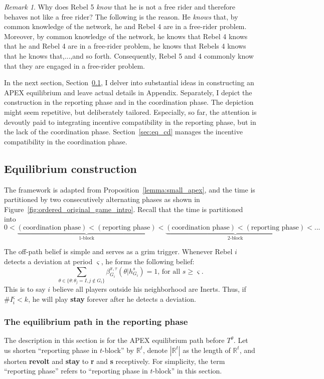 \documentclass[12pt,letter]{article}
\newcommand{\Omicron}{\mathbb{R}}
\theoremstyle{definition}
\theoremstyle{remark}
\newtheorem*{remark}{Remark}
\theoremstyle{claim}
\begin{document}
\begin{remark}
Why does Rebel 5 \textit{know} that he is not a free rider and therefore behaves not like a free rider? The following is the reason. He \textit{knows} that, by common knowledge of the network, he and Rebel 4 are in a free-rider problem. Moreover, by common knowledge of the network, he knows that Rebel 4 knows that he and Rebel 4 are in a free-rider problem, he knows that Rebels 4 knows that he knows that,...,and so forth. Consequently, Rebel 5 and 4 commonly know that they are engaged in a free-rider problem. 
\end{remark}
In the next section, Section~\ref{sec:dis_writing}, I delver into substantial ideas in constructing an APEX equilibrium and leave actual details in Appendix. Separately, I depict the construction in the reporting phase and in the coordination phase. The depiction might seem repetitive, but deliberately tailored. Especially, so far, the attention is devoutly paid to integrating incentive compatibility in the reporting phase, but in the lack of the coordination phase. Section~\ref{sec:eq_cd} manages the incentive compatibility in the coordination phase.
\subsection{Equilibrium construction}
\label{sec:dis_writing}
The framework is adapted from Proposition~\ref{lemma:small_apex}, and the time is partitioned by two consecutively alternating phases as shown in Figure~\ref{fig:ordered_original_game_intro}. Recall that the time is partitioned into
\[0<\underbrace{(\text{coordination phase})<(\text{reporting phase})}_{\text{$1$-block}}<\underbrace{(\text{coordination phase})<(\text{reporting phase})}_{\text{$2$-block}}<...\]

The off-path belief is simple and serves as a grim trigger. Whenever Rebel $i$ detects a deviation at period $\varsigma$, he forms the following belief: 
\begin{equation}
\label{eq_grim_trigger}
\sum_{\theta \in \{\theta:\theta_j=I,j\notin G_i\}}\beta^{\pi,\tau}_{G_i}({\theta}|h^{s}_{G_i})=1 \text{, for all $s\geq \varsigma$}.
\end{equation}
This is to say $i$ believe all players outside his neighborhood are Inerts. Thus, if $\# I^{\varsigma}_i<k$, he will play \textbf{stay} forever after he detects a deviation. 

\subsubsection{The equilibrium path in the reporting phase}
\label{sec:eq_rp}
The description in this section is for the APEX equilibrium path {before} $T^{\theta}$. Let us shorten ``reporting phase in $t$-block'' by $\Omicron^{t}$, denote $|\Omicron^t|$ as the length of $\Omicron^{t}$, and shorten \textbf{revolt} and \textbf{stay} to \textbf{r} and \textbf{s} receptively. For simplicity, the term ``reporting phase'' refers to ``reporting phase in $t$-block'' in this section.
\end{document}
